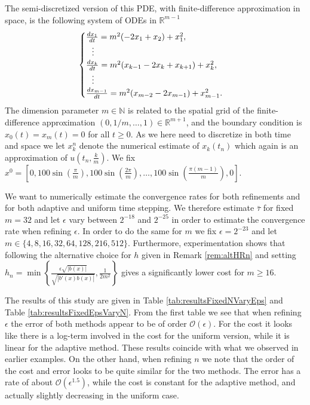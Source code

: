 \documentclass[a4paper, oneside, reqno]{amsart}
\newcommand{\abs}[1]{\left\lvert#1\right\rvert}
\newcommand{\R}{\mathbb{R}}
\theoremstyle{remark}
\begin{document}
The semi-discretized version of this PDE, with finite-difference approximation in space, is the following system of ODEs in $\R^{m-1}$
\[
\begin{cases}
    \frac{dx_1}{dt} = m^2(-2x_1 + x_2) + x_1^2, \\
    \hspace{2.5mm}\vdots \\
    \frac{dx_k}{dt} = m^2(x_{k-1}-2x_k + x_{k+1}) + x_k^2, \\
    \hspace{2.5mm}\vdots \\
    \frac{dx_{m-1}}{dt} = m^2(x_{m-2}-2x_{m-1}) + x_{m-1}^2.
\end{cases}
\]
The dimension parameter $m \in \mathbb{N}$ is related to the spatial grid of the finite-difference approximation $(0, 1/m, \ldots, 1) \in \R^{m+1}$, and the boundary condition is \(x_0(t) = x_m(t) = 0\) for all $t\ge 0$.  
As we here need to discretize in both time and space we let \(x_k^n\) denote the numerical estimate of \(x_k(t_n)\) which again is an approximation of \(u(t_n, \frac{k}{m})\). 
We fix \(x^0 = \left[0, 100\sin\left(\frac{\pi}{m}\right), 100\sin\left(\frac{2\pi}{m}\right),\hdots, 100\sin\left(\frac{\pi(m-1)}{m}\right), 0\right]\). 

We want to numerically estimate the convergence rates for both refinements and for both adaptive and uniform time stepping. 
We therefore estimate \(\bar\tau\) for fixed \(m=32\) and let \(\epsilon\) vary between \(2^{-18}\) and \(2^{-25}\) in order to estimate the convergence rate when refining \(\epsilon\). 
In order to do the same for \(m\) we fix \(\epsilon=2^{-23}\) and let \(m \in \{4, 8, 16, 32, 64, 128, 216, 512\}\). 
Furthermore, experimentation shows that following the alternative choice for \(h\) given in Remark \ref{rem:altHRn} and setting \(h_n = \min\left\{\frac{\epsilon\sqrt{\abs{b(x)}}}{\sqrt{\abs{b'(x)b(x)}}}, \frac{1}{2m^2}\right\}\)  gives a significantly lower cost for \(m\geq16\).

The results of this study are given in Table \ref{tab:resultsFixedNVaryEps} and Table \ref{tab:resultsFixedEpsVaryN}. 
From the first table we see that when refining \(\epsilon\) the error of both methods appear to be of order \(\mathcal{O}(\epsilon)\). 
For the cost it looks like there is a log-term involved in the cost for the uniform version, while it is linear for the adaptive method. 
These results coincide with what we observed in earlier examples.
On the other hand, when refining \(n\) we note that the order of the cost and error looks to be quite similar for the two methods. The error has a rate of about \(\mathcal{O}(\epsilon^{1.5})\), while the cost is constant for the adaptive method, and actually slightly decreasing in the uniform case. 
\end{document}
